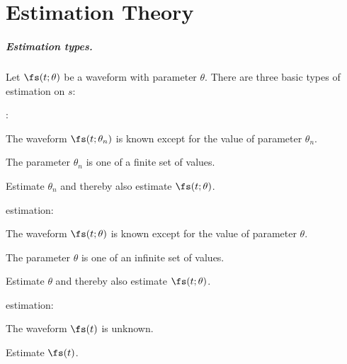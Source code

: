 
\chapter{Estimation Theory }
\label{app:est}
\paragraph{Estimation types.}
Let $\fs(t;\theta)$ be a waveform with parameter $\theta$.
There are three basic types of estimation on $s$:

\begin{enume}
   \item {}:
      \begin{liste}
         \item The waveform $\fs(t;\theta_n)$ is known except for the value of parameter $\theta_n$.
         \item The parameter $\theta_n$ is one of a finite set of values.
         \item Estimate $\theta_n$ and thereby also estimate $\fs(t;\theta)$.
      \end{liste}
   \item {} estimation:
      \begin{liste}
         \item The waveform $\fs(t;\theta)$ is known except for the value of parameter $\theta$.
         \item The parameter $\theta$ is one of an infinite set of values.
         \item Estimate $\theta$ and thereby also estimate $\fs(t;\theta)$.
      \end{liste}
   \item {} estimation:
      \begin{liste}
         \item The waveform $\fs(t)$ is unknown.
         \item Estimate $\fs(t)$.
      \end{liste}
\end{enume}

